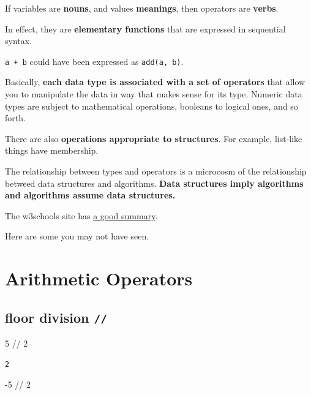 \documentclass[
  letterpaper,
  DIV=11,
  numbers=noendperiod]{scrreprt}
\newenvironment{Shaded}{\begin{snugshade}}{\end{snugshade}}
\newcommand{\DecValTok}[1]{\textcolor[rgb]{0.68,0.00,0.00}{#1}}
\newcommand{\OperatorTok}[1]{\textcolor[rgb]{0.37,0.37,0.37}{#1}}
\begin{document}
If variables are \textbf{nouns}, and values \textbf{meanings}, then
operators are \textbf{verbs}.

In effect, they are \textbf{elementary functions} that are expressed in
sequential syntax.

\texttt{a\ +\ b} could have been expressed as \texttt{add(a,\ b)}.

Basically, \textbf{each data type is associated with a set of operators}
that allow you to manipulate the data in way that makes sense for its
type. Numeric data types are subject to mathematical operations,
booleans to logical ones, and so forth.

There are also \textbf{operations appropriate to structures}. For
example, list-like things have membership.

The relationship between types and operators is a microcosm of the
relationship betweed data structures and algorithms. \textbf{Data
structures imply algorithms and algorithms assume data structures.}

The w3schools site has
\href{https://www.w3schools.com/python/python_operators.asp}{a good
summary}.

Here are some you may not have seen.

\hypertarget{arithmetic-operators}{%
\section{Arithmetic Operators}\label{arithmetic-operators}}

\hypertarget{floor-division}{%
\subsection{\texorpdfstring{floor division
\texttt{//}}{floor division //}}\label{floor-division}}

\begin{Shaded}
\begin{Highlighting}[]
\DecValTok{5} \OperatorTok{//} \DecValTok{2}
\end{Highlighting}
\end{Shaded}

\begin{verbatim}
2
\end{verbatim}

\begin{Shaded}
\begin{Highlighting}[]
\OperatorTok{{-}}\DecValTok{5} \OperatorTok{//} \DecValTok{2}
\end{Highlighting}
\end{Shaded}
\end{document}
